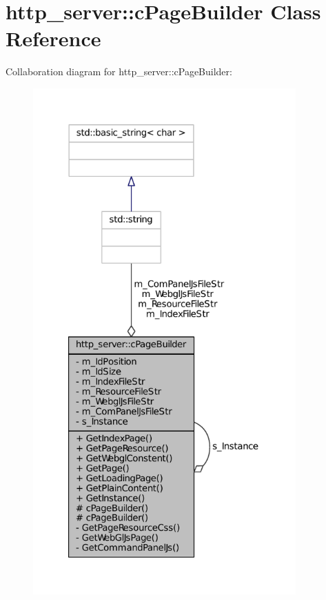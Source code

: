 \hypertarget{classhttp__server_1_1cPageBuilder}{\section{http\-\_\-server\-:\-:c\-Page\-Builder \-Class \-Reference}
\label{classhttp__server_1_1cPageBuilder}
}


\-Collaboration diagram for http\-\_\-server\-:\-:c\-Page\-Builder\-:\nopagebreak
\begin{figure}[H]
\begin{center}
\leavevmode
\includegraphics[height=550pt]{classhttp__server_1_1cPageBuilder__coll__graph}
\end{center}
\end{figure}
